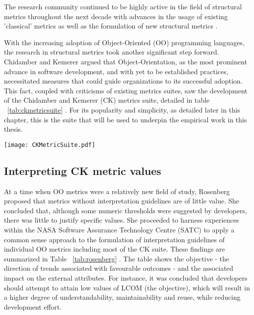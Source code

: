 The research community continued to be highly active in the field of structural metrics throughout the next decade \citep{cote1988software} with advances in the usage of existing 'classical' metrics \citep{behrens1983measuring, gaffney1981metrics} as well as the formulation of new structural metrics \citep{boydston1984programming, prather1984axiomatic}.

With the increasing adoption of Object-Oriented (OO) programming languages, the research in structural metrics took another significant step forward. Chidamber and Kemerer argued that Object-Orientation, as the most prominent advance in software development, and with yet to be established practices, necessitated measures that could guide organizations to its successful adoption. This fact, coupled with criticisms of existing metrics suites, saw the development of the Chidamber and Kemerer (CK) metrics suite, detailed in table ~\ref{tab:ckmetricsuite} \citep{chidamber1994metrics}. For its popularity and simplicity, as detailed later in this chapter, this is the suite that will be used to underpin the empirical work in this thesis.

\begin{table}
\begin{tabular}
 \centering 
 \texttt{[image: CKMetricSuite.pdf]}
 \label{tab:ckmetricsuite}
\end{tabular}
\end{table}

\subsection{Interpreting CK metric values}
At a time when OO metrics were a relatively new field of study, Rosenberg \citep{rosenberg1998applying} proposed that metrics without interpretation guidelines are of little value. She concluded that, although some numeric thresholds were suggested by developers, there was little to justify specific values. She proceeded to harness experiences within the NASA Software Assurance Technology Centre (SATC) to apply a common sense approach to the formulation of interpretation guidelines of individual OO metrics including most of the CK suite. These findings are summarized in Table ~\ref{tab:rosenberg} \citep{rosenberg1998applying}. The table shows the objective  - the direction of trends associated with favourable outcomes - and the associated impact on the external attributes. For instance, it was concluded that developers should attempt to attain low values of LCOM (the objective), which will result in a higher degree of understandability, maintainability and reuse, while reducing development effort. 

